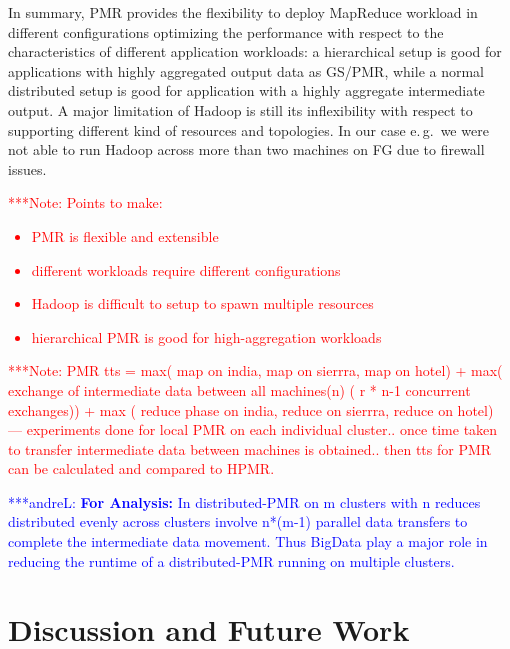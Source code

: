 \documentclass{acm_proc_article-sp}
\newcommand{\jhanote}[1]{ {\textcolor{red} { ***shantenu: #1 }}}
\newcommand{\alnote}[1]{ {\textcolor{blue} { ***andreL: #1 }}}
\newcommand{\note}[1]{ {\textcolor{red} { ***Note: #1 }}}
\newcommand{\alnote}[1]{}
\newcommand{\jhanote}[1]{}
\newcommand{\note}[1]{}
\begin{document}


In summary, PMR provides the flexibility to deploy MapReduce workload in
different configurations optimizing the performance with respect to the
characteristics of different application workloads: a hierarchical setup is good
for applications with highly aggregated output data as GS/PMR, while a normal
distributed setup is good for application with a highly aggregate intermediate
output. A major limitation of Hadoop is still its inflexibility with respect to
supporting different kind of resources and topologies. In our case e.\,g.\ we
were not able to run Hadoop across more than two machines on FG due to firewall
issues.


\note{Points to make:
\begin{itemize}
	\item PMR is flexible and extensible
	\item different workloads require different configurations
	\item Hadoop is difficult to setup to spawn multiple resources
	\item hierarchical PMR is good for high-aggregation workloads
\end{itemize}}




\note{
PMR tts = max( map  on india, map on  sierrra, map on hotel) + max( exchange of 
intermediate data between all machines(n) ( r * n-1 concurrent exchanges)) + max 
( reduce phase on  india, reduce on  sierrra, reduce on hotel)
--- experiments done for local PMR on each individual cluster.. once time 
taken to transfer intermediate data between machines is obtained.. then tts 
for PMR can be calculated and compared to HPMR.
}

\alnote{\textbf{For Analysis:}
In distributed-PMR on m clusters
with n reduces distributed evenly across clusters involve n*(m-1) parallel data
transfers to complete the intermediate data movement. Thus BigData play a major
role in reducing the runtime of a distributed-PMR running on multiple clusters.
}

\section{Discussion and Future Work}
\label{sec-conclusion}
\end{document}
